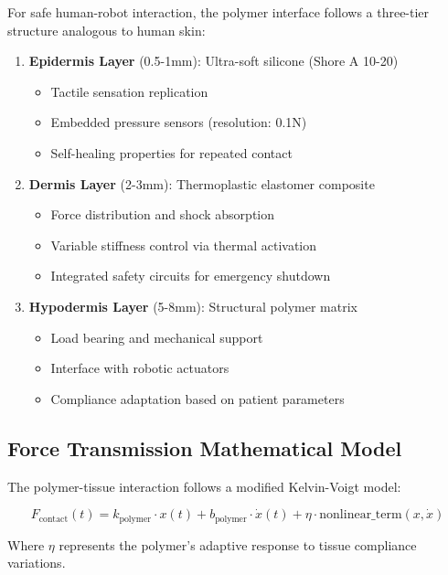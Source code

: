 \documentclass[11pt]{article}
\begin{document}
For safe human-robot interaction, the polymer interface follows a three-tier structure analogous to human skin:

\begin{enumerate}
\item \textbf{Epidermis Layer} (0.5-1mm): Ultra-soft silicone (Shore A 10-20)
   \begin{itemize}
   \item Tactile sensation replication
   \item Embedded pressure sensors (resolution: 0.1N)
   \item Self-healing properties for repeated contact
   \end{itemize}

\item \textbf{Dermis Layer} (2-3mm): Thermoplastic elastomer composite
   \begin{itemize}
   \item Force distribution and shock absorption
   \item Variable stiffness control via thermal activation
   \item Integrated safety circuits for emergency shutdown
   \end{itemize}

\item \textbf{Hypodermis Layer} (5-8mm): Structural polymer matrix
   \begin{itemize}
   \item Load bearing and mechanical support
   \item Interface with robotic actuators
   \item Compliance adaptation based on patient parameters
   \end{itemize}
\end{enumerate}

\subsection{Force Transmission Mathematical Model}

The polymer-tissue interaction follows a modified Kelvin-Voigt model:

\begin{equation}
F_{\text{contact}}(t) = k_{\text{polymer}} \cdot x(t) + b_{\text{polymer}} \cdot \dot{x}(t) + \eta \cdot \text{nonlinear\_term}(x, \dot{x})
\end{equation}

Where $\eta$ represents the polymer's adaptive response to tissue compliance variations.
\end{document}
